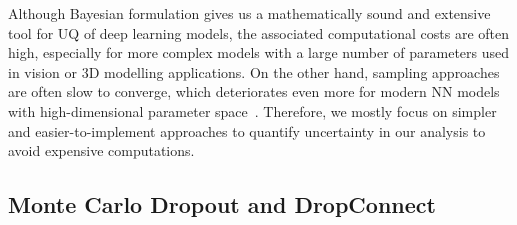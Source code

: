 Although Bayesian formulation gives us a mathematically sound and extensive tool for UQ of deep learning models, the associated computational costs are often high, especially for more complex models with a large number of parameters used in vision or 3D modelling applications. On the other hand, sampling approaches are often slow to converge, which deteriorates even more for modern NN models with high-dimensional parameter space~\cite{BayesNN}. Therefore, we mostly focus on simpler and easier-to-implement approaches to quantify uncertainty in our analysis to avoid expensive computations.



    \subsection{Monte Carlo Dropout and DropConnect}\label{MCDrop}
